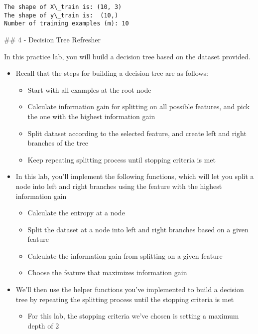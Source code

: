 \documentclass[11pt]{article}
\providecommand{\tightlist}{%
      \setlength{\itemsep}{0pt}\setlength{\parskip}{0pt}}
\begin{document}
    \begin{Verbatim}[commandchars=\\\{\}]
The shape of X\_train is: (10, 3)
The shape of y\_train is:  (10,)
Number of training examples (m): 10
    \end{Verbatim}

    \#\# 4 - Decision Tree Refresher

In this practice lab, you will build a decision tree based on the
dataset provided.

\begin{itemize}
\tightlist
\item
  Recall that the steps for building a decision tree are as follows:

  \begin{itemize}
  \tightlist
  \item
    Start with all examples at the root node
  \item
    Calculate information gain for splitting on all possible features,
    and pick the one with the highest information gain
  \item
    Split dataset according to the selected feature, and create left and
    right branches of the tree
  \item
    Keep repeating splitting process until stopping criteria is met
  \end{itemize}
\item
  In this lab, you'll implement the following functions, which will let
  you split a node into left and right branches using the feature with
  the highest information gain

  \begin{itemize}
  \tightlist
  \item
    Calculate the entropy at a node
  \item
    Split the dataset at a node into left and right branches based on a
    given feature
  \item
    Calculate the information gain from splitting on a given feature
  \item
    Choose the feature that maximizes information gain
  \end{itemize}
\item
  We'll then use the helper functions you've implemented to build a
  decision tree by repeating the splitting process until the stopping
  criteria is met

  \begin{itemize}
  \tightlist
  \item
    For this lab, the stopping criteria we've chosen is setting a
    maximum depth of 2
  \end{itemize}
\end{itemize}
\end{document}
